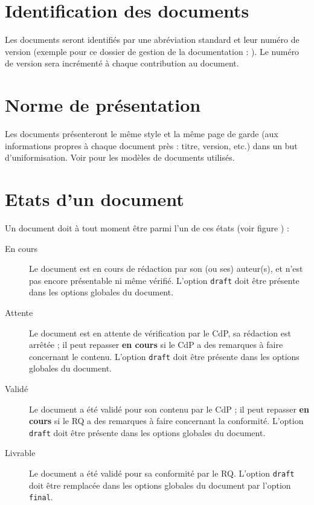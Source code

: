 \section{Identification des documents}

Les documents seront identifiés par une abréviation standard et leur numéro de version (exem\-ple pour ce dossier de gestion de la documentation : \docname). Le numéro de version sera incrémenté à chaque contribution au document.

\section{Norme de présentation}

Les documents présenteront le même style et la même page de garde (aux informations propres à chaque document près : titre, version, etc.) dans un but d'uniformisation.
Voir  pour les modèles de documents utilisés.

\section{Etats d'un document}

Un document doit à tout moment être parmi l'un de ces états (voir figure ) :
\begin{description}
\item[En cours]{Le document est en cours de rédaction par son (ou ses) auteur(s), et n'est pas encore présentable ni même vérifié. L'option \verb|draft| doit être présente dans les options globales du document.}
\item[Attente]{Le document est en attente de vérification par le CdP, sa rédaction est arrêtée ; il peut repasser \textbf{en cours} si le CdP a des remarques à faire concernant le contenu. L'option \verb|draft| doit être présente dans les options globales du document.}
\item[Validé]{Le document a été validé pour son contenu par le CdP ; il peut repasser \textbf{en cours} si le RQ a des remarques à faire concernant la conformité. L'option \verb|draft| doit être présente dans les options globales du document.}
\item[Livrable]{Le document a été validé pour sa conformité par le RQ. L'option \verb|draft| doit être remplacée dans les options globales du document par l'option \verb|final|.}
\end{description}

